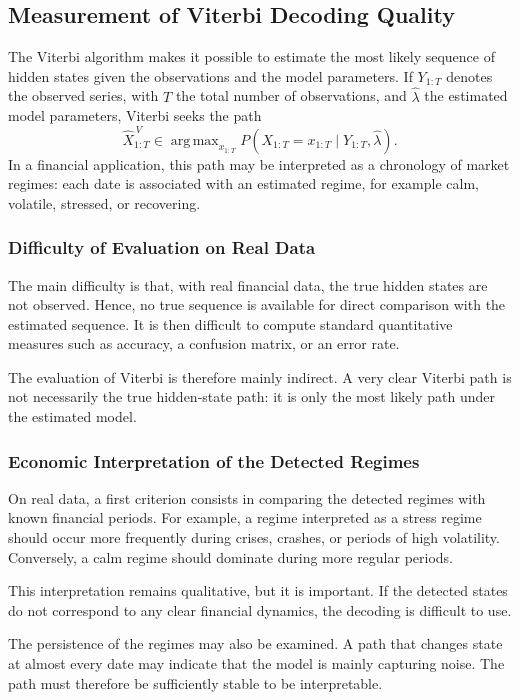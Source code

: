 \documentclass[11pt]{article}
\begin{document}
\subsection{Measurement of Viterbi Decoding Quality}

The Viterbi algorithm makes it possible to estimate the most likely sequence of hidden states given the observations and the model parameters. If \(Y_{1:T}\) denotes the observed series, with \(T\) the total number of observations, and \(\widehat{\lambda}\) the estimated model parameters, Viterbi seeks the path
\[
\widehat{X}_{1:T}^{\,V}
\in
\mathop{\mathrm{arg\,max}}_{x_{1:T}}
P(X_{1:T}=x_{1:T}\mid Y_{1:T},\widehat{\lambda}).
\]
In a financial application, this path may be interpreted as a chronology of market regimes: each date is associated with an estimated regime, for example calm, volatile, stressed, or recovering.

\subsubsection{Difficulty of Evaluation on Real Data}

The main difficulty is that, with real financial data, the true hidden states are not observed. Hence, no true sequence is available for direct comparison with the estimated sequence. It is then difficult to compute standard quantitative measures such as accuracy, a confusion matrix, or an error rate.

The evaluation of Viterbi is therefore mainly indirect. A very clear Viterbi path is not necessarily the true hidden-state path: it is only the most likely path under the estimated model.

\subsubsection{Economic Interpretation of the Detected Regimes}

On real data, a first criterion consists in comparing the detected regimes with known financial periods. For example, a regime interpreted as a stress regime should occur more frequently during crises, crashes, or periods of high volatility. Conversely, a calm regime should dominate during more regular periods.

This interpretation remains qualitative, but it is important. If the detected states do not correspond to any clear financial dynamics, the decoding is difficult to use.

The persistence of the regimes may also be examined. A path that changes state at almost every date may indicate that the model is mainly capturing noise. The path must therefore be sufficiently stable to be interpretable.
\end{document}
